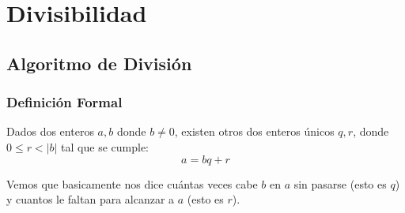 \documentclass[12pt, fleqn]{report}                             %
\begin{document}
\chapter{Divisibilidad}
    \clearpage

     

    \clearpage
    \section{Algoritmo de División}

        \subsection*{Definición Formal}

            Dados dos enteros $a, b$ donde $b \neq 0$, existen otros dos 
            enteros únicos $q, r$, donde $0 \leq r < |b|$ tal que se cumple:
            \begin{equation}
                a = bq+r
            \end{equation}

            Vemos que basicamente nos dice cuántas veces cabe $b$ en $a$ sin pasarse (esto 
            es $q$) y cuantos le faltan para alcanzar a $a$ (esto es $r$).
\end{document}
